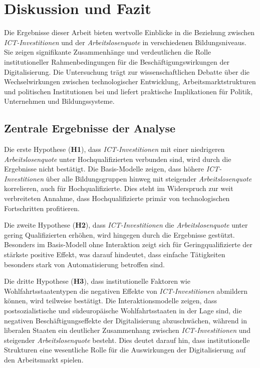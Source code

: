 
\section{Diskussion und Fazit}

Die Ergebnisse dieser Arbeit bieten wertvolle Einblicke in die Beziehung zwischen 
\textit{\ac{ICT}-Investitionen} und der \textit{Arbeitslosenquote} in verschiedenen 
Bildungsniveaus. Sie zeigen signifikante Zusammenhänge und verdeutlichen die Rolle 
institutioneller Rahmenbedingungen für die Beschäftigungswirkungen der Digitalisierung. 
Die Untersuchung trägt zur wissenschaftlichen Debatte über die Wechselwirkungen 
zwischen technologischer Entwicklung, Arbeitsmarktstrukturen und politischen 
Institutionen bei und liefert praktische Implikationen für Politik, Unternehmen 
und Bildungssysteme.

\subsection{Zentrale Ergebnisse der Analyse}

Die erste Hypothese (\textbf{H1}), dass \textit{\ac{ICT}-Investitionen} mit einer 
niedrigeren \textit{Arbeitslosenquote} unter Hochqualifizierten verbunden sind, wird 
durch die Ergebnisse nicht bestätigt. Die Basis-Modelle zeigen, dass höhere 
\textit{\ac{ICT}-Investitionen} über alle Bildungsgruppen hinweg mit steigender 
\textit{Arbeitslosenquote} korrelieren, auch für Hochqualifizierte. Dies steht im 
Widerspruch zur weit verbreiteten Annahme, dass Hochqualifizierte primär von 
technologischen Fortschritten profitieren.

Die zweite Hypothese (\textbf{H2}), dass \textit{\ac{ICT}-Investitionen} die 
\textit{Arbeitslosenquote} unter gering Qualifizierten erhöhen, wird hingegen durch 
die Ergebnisse gestützt. Besonders im Basis-Modell ohne Interaktion zeigt sich für 
Geringqualifizierte der stärkste positive Effekt, was darauf hindeutet, dass einfache 
Tätigkeiten besonders stark von Automatisierung betroffen sind.

Die dritte Hypothese (\textbf{H3}), dass institutionelle Faktoren wie 
Wohlfahrtsstaatentypen die negativen Effekte von \textit{\ac{ICT}-Investitionen} 
abmildern können, wird teilweise bestätigt. Die Interaktionsmodelle zeigen, dass 
postsozialistische und südeuropäische Wohlfahrtsstaaten in der Lage sind, die 
negativen Beschäftigungseffekte der Digitalisierung abzuschwächen, während in 
liberalen Staaten ein deutlicher Zusammenhang zwischen \textit{\ac{ICT}-Investitionen} 
und steigender \textit{Arbeitslosenquote} besteht. Dies deutet darauf hin, dass 
institutionelle Strukturen eine wesentliche Rolle für die Auswirkungen der 
Digitalisierung auf den Arbeitsmarkt spielen.


